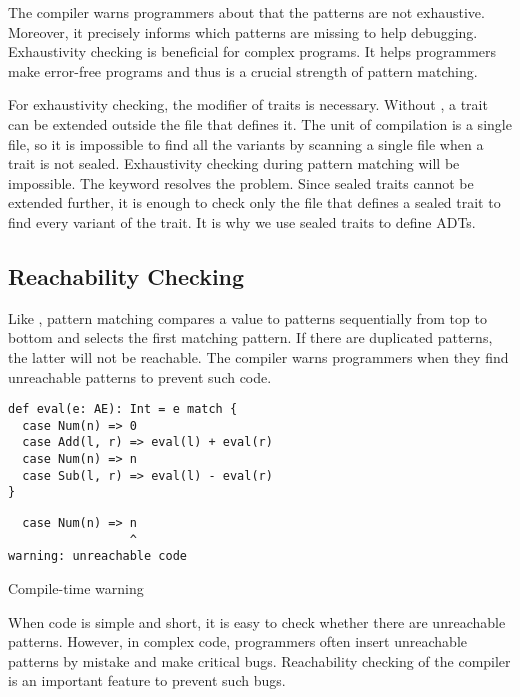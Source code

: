 The compiler warns programmers about that the patterns are not exhaustive. Moreover, it precisely
informs which patterns are missing to help debugging.
Exhaustivity checking is beneficial for complex programs. It helps programmers make
error-free programs and thus is a crucial strength of pattern matching.

For exhaustivity checking, the  modifier of traits is necessary.
Without , a trait can be extended outside the file that defines it.
The unit of compilation is a single file, so it is impossible to find
all the variants by scanning a single file when a trait is not sealed.
Exhaustivity checking during pattern matching will be impossible.
The  keyword resolves the problem. Since sealed traits cannot be
extended further, it is enough to check only the file that defines a sealed trait to find
every variant of the trait. It is why we use sealed traits to define ADTs.

\subsection{Reachability Checking}

Like , pattern
matching compares a value to patterns sequentially from top to bottom and selects
the first matching pattern. If there are duplicated patterns, the latter will
not be reachable.
The compiler warns programmers when they find unreachable patterns to prevent such code.

\begin{verbatim}
def eval(e: AE): Int = e match {
  case Num(n) => 0
  case Add(l, r) => eval(l) + eval(r)
  case Num(n) => n
  case Sub(l, r) => eval(l) - eval(r)
}
\end{verbatim}
\vspace{-1em}
\begin{mdframed}[hidealllines=true,backgroundcolor=yellow!10,innerleftmargin=3pt,innerrightmargin=3pt,leftmargin=-3pt,rightmargin=-3pt]
\begin{verbatim}
  case Num(n) => n
                 ^
warning: unreachable code
\end{verbatim}
\vspace{-2em}
\begin{flushright}
\scriptsize\textsf{Compile-time warning}
\end{flushright}
\end{mdframed}

When code is simple and short, it is easy to check whether there are unreachable
patterns. However, in complex code, programmers often insert unreachable
patterns by mistake and make critical bugs. Reachability checking of the
compiler is an important feature to prevent such bugs.

